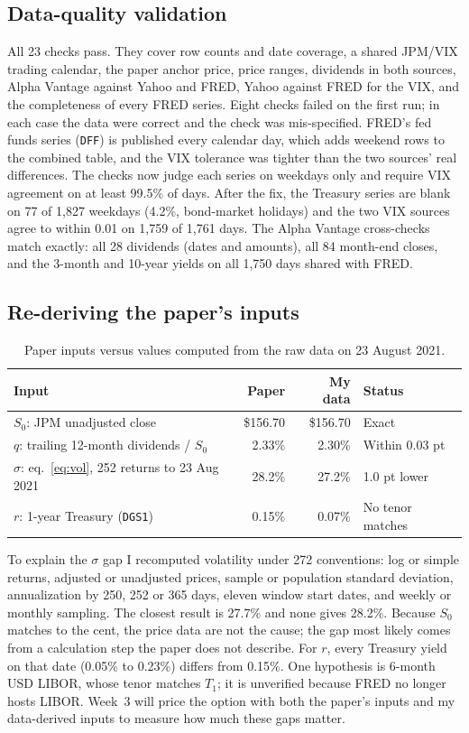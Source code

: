 \documentclass[11pt]{article}
\newcommand{\code}[1]{\texttt{#1}}
\begin{document}
\subsection{Data-quality validation}
All 23 checks pass. They cover row counts and date coverage, a shared JPM/VIX trading calendar, the paper anchor
price, price ranges, dividends in both sources, Alpha Vantage against Yahoo and FRED, Yahoo against FRED for the VIX,
and the completeness of every FRED series. Eight checks failed on the first run; in each case the data were correct
and the check was mis-specified. FRED's fed funds series (\code{DFF}) is published every calendar day, which adds
weekend rows to the combined table, and the VIX tolerance was tighter than the two sources' real differences.
The checks now judge each series on weekdays only and require VIX agreement on at least 99.5\% of days. After the
fix, the Treasury series are blank on 77 of 1,827 weekdays (4.2\%, bond-market holidays) and the two VIX sources agree
to within 0.01 on 1,759 of 1,761 days. The Alpha Vantage cross-checks match exactly: all 28 dividends (dates and
amounts), all 84 month-end closes, and the 3-month and 10-year yields on all 1,750 days shared with FRED.

\subsection{Re-deriving the paper's inputs}
\begin{table}[H]
\centering\small
\caption{Paper inputs versus values computed from the raw data on 23 August 2021.}
\label{tab:rederive}
\begin{tabular}{@{}lrrl@{}}
\toprule
Input & Paper & My data & Status \\
\midrule
$S_0$: JPM unadjusted close                         & \$156.70 & \$156.70 & Exact \\
$q$: trailing 12-month dividends / $S_0$             & 2.33\%   & 2.30\%   & Within 0.03 pt \\
$\sigma$: eq.~\eqref{eq:vol}, 252 returns to 23 Aug 2021 & 28.2\%   & 27.2\%   & 1.0 pt lower \\
$r$: 1-year Treasury (\code{DGS1})                  & 0.15\%   & 0.07\%   & No tenor matches \\
\bottomrule
\end{tabular}
\end{table}

To explain the $\sigma$ gap I recomputed volatility under 272 conventions: log or simple returns, adjusted or
unadjusted prices, sample or population standard deviation, annualization by 250, 252 or 365 days, eleven window
start dates, and weekly or monthly sampling. The closest result is 27.7\% and none gives 28.2\%. Because $S_0$
matches to the cent, the price data are not the cause; the gap most likely comes from a calculation step the paper
does not describe. For $r$, every Treasury yield on that date (0.05\% to 0.23\%) differs from 0.15\%. One hypothesis
is 6-month USD LIBOR, whose tenor matches $T_1$; it is unverified because FRED no longer hosts LIBOR. Week~3 will
price the option with both the paper's inputs and my data-derived inputs to measure how much these gaps matter.
\end{document}

